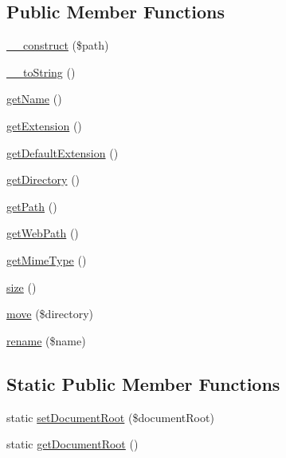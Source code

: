 \subsection*{\-Public \-Member \-Functions}
\begin{DoxyCompactItemize}
\item 
\hyperlink{class_symfony_1_1_component_1_1_http_foundation_1_1_file_1_1_file_a03853ceaa393e487835b287de58aba5a}{\-\_\-\-\_\-construct} (\$path)
\item 
\hyperlink{class_symfony_1_1_component_1_1_http_foundation_1_1_file_1_1_file_a7516ca30af0db3cdbf9a7739b48ce91d}{\-\_\-\-\_\-to\-String} ()
\item 
\hyperlink{class_symfony_1_1_component_1_1_http_foundation_1_1_file_1_1_file_a3d0963e68bb313b163a73f2803c64600}{get\-Name} ()
\item 
\hyperlink{class_symfony_1_1_component_1_1_http_foundation_1_1_file_1_1_file_ae6914d3a98b1490a7da85ffb5e4cb8ab}{get\-Extension} ()
\item 
\hyperlink{class_symfony_1_1_component_1_1_http_foundation_1_1_file_1_1_file_a0a5746e9910caf25a64b1c8681a8a52e}{get\-Default\-Extension} ()
\item 
\hyperlink{class_symfony_1_1_component_1_1_http_foundation_1_1_file_1_1_file_ae91c1c5598123b895e7de5df270bd0fd}{get\-Directory} ()
\item 
\hyperlink{class_symfony_1_1_component_1_1_http_foundation_1_1_file_1_1_file_a30c5c67b2bf8e2e2ccc7e361faa20afe}{get\-Path} ()
\item 
\hyperlink{class_symfony_1_1_component_1_1_http_foundation_1_1_file_1_1_file_a286c17b4a3ffdc0dc8a6af1cbbf4e419}{get\-Web\-Path} ()
\item 
\hyperlink{class_symfony_1_1_component_1_1_http_foundation_1_1_file_1_1_file_ac06e9f7b10fca30eb41e41d4dc108b1c}{get\-Mime\-Type} ()
\item 
\hyperlink{class_symfony_1_1_component_1_1_http_foundation_1_1_file_1_1_file_a775bfb88c1bb7975d67f277eade2a1b7}{size} ()
\item 
\hyperlink{class_symfony_1_1_component_1_1_http_foundation_1_1_file_1_1_file_a2430eaa80b28941a8be89db71eea9261}{move} (\$directory)
\item 
\hyperlink{class_symfony_1_1_component_1_1_http_foundation_1_1_file_1_1_file_af143448d0e85a8c9b6a75f94333bf4f1}{rename} (\$name)
\end{DoxyCompactItemize}
\subsection*{\-Static \-Public \-Member \-Functions}
\begin{DoxyCompactItemize}
\item 
static \hyperlink{class_symfony_1_1_component_1_1_http_foundation_1_1_file_1_1_file_a4851030aa76ad58a4180ba68aa1e653a}{set\-Document\-Root} (\$document\-Root)
\item 
static \hyperlink{class_symfony_1_1_component_1_1_http_foundation_1_1_file_1_1_file_a36bb401a7ec088729425ca239771dd22}{get\-Document\-Root} ()
\end{DoxyCompactItemize}
